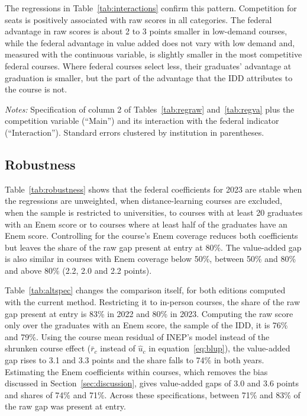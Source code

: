 \documentclass[11pt,a4paper]{article}
\begin{document}
The regressions in Table~\ref{tab:interactions} confirm this pattern. Competition for seats is positively associated with raw scores in all categories. The federal advantage in raw scores is about 2 to 3 points smaller in low-demand courses, while the federal advantage in value added does not vary with low demand and, measured with the continuous variable, is slightly smaller in the most competitive federal courses. Where federal courses select less, their graduates' advantage at graduation is smaller, but the part of the advantage that the IDD attributes to the course is not.

\begin{table}[!htbp]
\centering\footnotesize
\caption{Interactions between the federal indicator and competition for seats, Enade 2023}\label{tab:interactions}
\resizebox{\linewidth}{!}{}
\begin{minipage}{\linewidth}\vspace{0.4em}\scriptsize
\textit{Notes:} Specification of column 2 of Tables~\ref{tab:regraw} and~\ref{tab:regva} plus the competition variable (``Main'') and its interaction with the federal indicator (``Interaction''). Standard errors clustered by institution in parentheses.
\end{minipage}
\end{table}

\subsection{Robustness}

Table~\ref{tab:robustness} shows that the federal coefficients for 2023 are stable when the regressions are unweighted, when distance-learning courses are excluded, when the sample is restricted to universities, to courses with at least 20 graduates with an Enem score or to courses where at least half of the graduates have an Enem score. Controlling for the course's Enem coverage reduces both coefficients but leaves the share of the raw gap present at entry at 80\%. The value-added gap is also similar in courses with Enem coverage below 50\%, between 50\% and 80\% and above 80\% (2.2, 2.0 and 2.2 points).

Table~\ref{tab:altspec} changes the comparison itself, for both editions computed with the current method. Restricting it to in-person courses, the share of the raw gap present at entry is 83\% in 2022 and 80\% in 2023. Computing the raw score only over the graduates with an Enem score, the sample of the IDD, it is 76\% and 79\%. Using the course mean residual of INEP's model instead of the shrunken course effect ($\bar r_c$ instead of $\hat u_c$ in equation~\eqref{eq:blup}), the value-added gap rises to 3.1 and 3.3 points and the share falls to 74\% in both years. Estimating the Enem coefficients within courses, which removes the bias discussed in Section~\ref{sec:discussion}, gives value-added gaps of 3.0 and 3.6 points and shares of 74\% and 71\%. Across these specifications, between 71\% and 83\% of the raw gap was present at entry.
\end{document}

